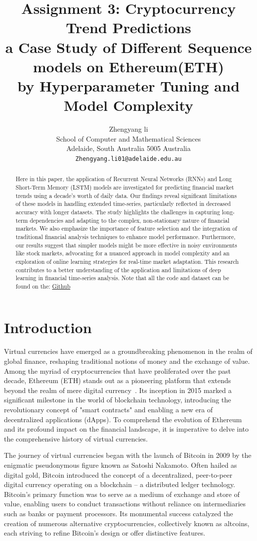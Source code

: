 \documentclass[10pt,twocolumn,letterpaper]{article}
\title{Assignment 3: Cryptocurrency Trend Predictions\\
a Case Study of Different Sequence models on Ethereum(ETH) \\
by Hyperparameter Tuning and Model Complexity}  %
\author{Zhengyang li\\
   School of Computer and Mathematical Sciences\\
   Adelaide, South Australia 5005 Australia\\
   \tt\small Zhengyang.li01@adelaide.edu.au}
\begin{document}
\maketitle
\begin{abstract}
   Here in this paper, the application of Recurrent Neural Networks (RNNs) and Long Short-Term Memory (LSTM) models are investigated for predicting financial market trends using a decade's worth of daily data. Our findings reveal significant limitations of these models in handling extended time-series, particularly reflected in decreased accuracy with longer datasets. The study highlights the challenges in capturing long-term dependencies and adapting to the complex, non-stationary nature of financial markets. We also emphasize the importance of feature selection and the integration of traditional financial analysis techniques to enhance model performance. Furthermore, our results suggest that simpler models might be more effective in noisy environments like stock markets, advocating for a nuanced approach in model complexity and an exploration of online learning strategies for real-time market adaptation. This research contributes to a better understanding of the application and limitations of deep learning in financial time-series analysis. Note that all the code and dataset can be found on the: \href{https://github.com/David-Lzy/Deep_Learning_Fundamentals}{Github}
\end{abstract}

\section{Introduction}

Virtual currencies have emerged as a groundbreaking phenomenon in the realm of global finance, reshaping traditional notions of money and the exchange of value. Among the myriad of cryptocurrencies that have proliferated over the past decade, Ethereum (ETH) stands out as a pioneering platform that extends beyond the realm of mere digital currency~\cite{cryptocurrencyJFEC, cryptocurrencyCybersecurity}. Its inception in 2015 marked a significant milestone in the world of blockchain technology, introducing the revolutionary concept of "smart contracts" and enabling a new era of decentralized applications (dApps). To comprehend the evolution of Ethereum and its profound impact on the financial landscape, it is imperative to delve into the comprehensive history of virtual currencies.

The journey of virtual currencies began with the launch of Bitcoin in 2009 by the enigmatic pseudonymous figure known as Satoshi Nakamoto. Often hailed as digital gold, Bitcoin introduced the concept of a decentralized, peer-to-peer digital currency operating on a blockchain – a distributed ledger technology. Bitcoin's primary function was to serve as a medium of exchange and store of value, enabling users to conduct transactions without reliance on intermediaries such as banks or payment processors. Its monumental success catalyzed the creation of numerous alternative cryptocurrencies, collectively known as altcoins, each striving to refine Bitcoin's design or offer distinctive features.
\end{document}
